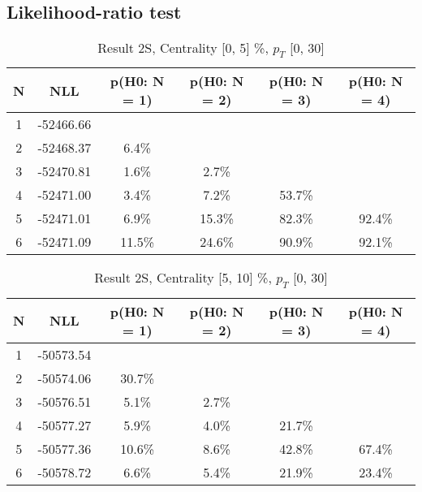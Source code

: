 \subsection{Likelihood-ratio test}
\begin{table}[htb]
	\begin{center}
	\caption{Result 2S, Centrality [0, 5] \%, $p_{T}$ [0, 30] \GeV
}
{\footnotesize\renewcommand{\arraystretch}{1.4}
		\begin{tabular}{cc||cccc}
			N & NLL & p(H0: N = 1) & p(H0: N = 2) & p(H0: N = 3) & p(H0: N = 4)\\ 
		\hline
1 & -52466.66 & & & & \\
2 & -52468.37 & 6.4\% & & & \\
3 & -52470.81 & 1.6\% & 2.7\% & & \\
4 & -52471.00 & 3.4\% & 7.2\% & 53.7\% & \\
5 & -52471.01 & 6.9\% & 15.3\% & 82.3\% & 92.4\% \\
6 & -52471.09 & 11.5\% & 24.6\% & 90.9\% & 92.1\% \\
	\end{tabular}
		\label{tab:lab}
	}
	\end{center}\end{table}

\begin{table}[htb]
	\begin{center}
	\caption{Result 2S, Centrality [5, 10] \%, $p_{T}$ [0, 30] \GeV
}
{\footnotesize\renewcommand{\arraystretch}{1.4}
		\begin{tabular}{cc||cccc}
			N & NLL & p(H0: N = 1) & p(H0: N = 2) & p(H0: N = 3) & p(H0: N = 4)\\ 
		\hline
1 & -50573.54 & & & & \\
2 & -50574.06 & 30.7\% & & & \\
3 & -50576.51 & 5.1\% & 2.7\% & & \\
4 & -50577.27 & 5.9\% & 4.0\% & 21.7\% & \\
5 & -50577.36 & 10.6\% & 8.6\% & 42.8\% & 67.4\% \\
6 & -50578.72 & 6.6\% & 5.4\% & 21.9\% & 23.4\% \\
	\end{tabular}
		\label{tab:lab}
	}
	\end{center}\end{table}

